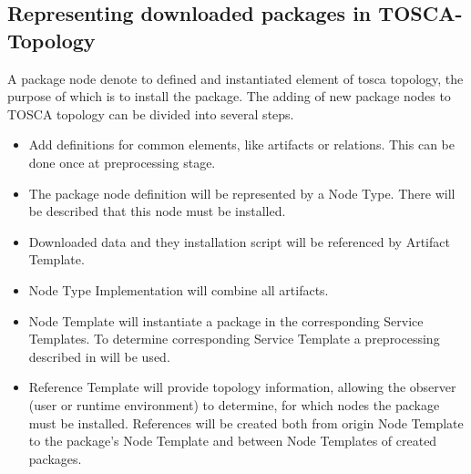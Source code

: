 \subsection{Representing downloaded packages in TOSCA-Topology}
A package node denote to defined and instantiated element of \gls{tosca} topology, the purpose of which is to install the package.
The adding of new package nodes to TOSCA topology can be divided into several steps.
\begin{itemize}
	\item Add definitions for common elements, like artifacts or relations. This can be done once at preprocessing stage.
	\item The package node definition will be represented by a Node Type. There will be described that this node must be installed.
	\item Downloaded data and they installation script will be referenced by Artifact Template.
	\item Node Type Implementation will combine all artifacts.
	\item Node Template will instantiate a package in the corresponding Service Templates.
		To determine corresponding Service Template a preprocessing described in  will be used.
	\item Reference Template will provide topology information, allowing the observer (user or runtime environment) to determine, for which nodes the package must be installed.
		References will be created both from origin Node Template to the package's Node Template and between Node Templates of created packages.
\end{itemize}
